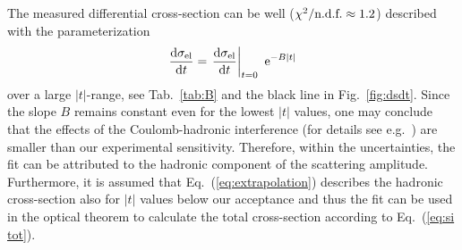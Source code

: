 \documentclass[doublecol]{epl/epl2}
\def\d{{\rm d}}
\def\e{{\rm e}}
\begin{document}
The measured differential cross-section can be well ($\chi^2/\hbox{n.d.f.} \approx 1.2$) described with the parameterization
\begin{equation}
\label{eq:extrapolation}
{\d\sigma_{\rm el}\over \d t} = \left. {\d\sigma_{\rm el}\over \d t}\right|_{t=0} \ \e^{-B|t|}
\end{equation}
over a large $|t|$-range, see Tab.~\ref{tab:B} and the black line
in Fig.~\ref{fig:dsdt}. Since the slope $B$ remains constant even for the lowest $|t|$ values, one may conclude that
the effects of the Coulomb-hadronic interference (for details see e.g.~\cite{kklp}) are smaller than our experimental sensitivity. Therefore, within the uncertainties, the fit can be attributed to the hadronic component of the scattering amplitude. Furthermore, it is assumed that Eq.~(\ref{eq:extrapolation}) describes the hadronic cross-section also for $|t|$ values below our acceptance and thus the fit can be used in the optical theorem to calculate the total cross-section according to Eq.~(\ref{eq:si tot}).
\end{document}
